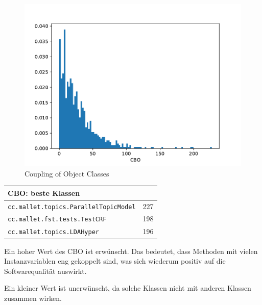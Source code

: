 \documentclass{scrreprt}
\newcommand{\lstx}[1]{\lstinline$#1$}
\begin{document}
\begin{figure}
 \centering
 \includegraphics[width=.8\textwidth]{./CBO.pdf}
 \caption{Coupling of Object Classes}
 \label{abb:cbo}
\end{figure}


\begin{center}
\end{center}


\begin{center}
\begin{tabular}{ll}
\toprule
CBO: beste Klassen\\
\midrule
\lstx{cc.mallet.topics.ParallelTopicModel} & 227 \\
\lstx{cc.mallet.fst.tests.TestCRF} & 198\\
 \lstx{cc.mallet.topics.LDAHyper}&196 \\
\bottomrule
\end{tabular}
\end{center}


Ein hoher Wert des CBO ist erwünscht. Das bedeutet, dass Methoden mit vielen Instanzvariablen eng gekoppelt sind, was sich wiederum positiv auf die Softwarequalität auswirkt.

Ein kleiner Wert ist unerwünscht, da solche Klassen nicht mit anderen Klassen zusammen wirken.
\end{document}
